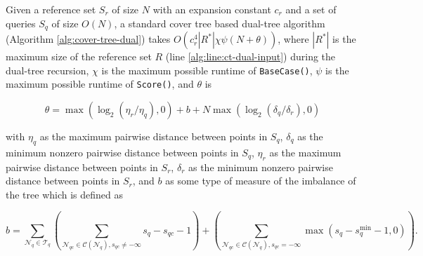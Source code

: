 \begin{thm}
\label{thm:ct-runtime}
Given a reference set $S_r$ of size $N$ with an expansion constant $c_r$ and a
set of queries $S_q$ of size $O(N)$, a standard cover tree based dual-tree
algorithm (Algorithm \ref{alg:cover-tree-dual}) takes $O(c_r^4 | R^* | \chi
\psi (N + \theta))$, where $ | R^* | $ is the maximum size of the reference set $R$ (line
\ref{alg:line:ct-dual-input}) during the dual-tree recursion, $\chi$ is
the maximum possible runtime of \texttt{BaseCase()}, $\psi$ is the maximum
possible runtime of \texttt{Score()}, and $\theta$ is

\begin{equation}
\theta = \max(\log_2(\eta_r / \eta_q), 0) + b + N \max(\log_2(\delta_q / \delta_r), 0)
\end{equation}

\noindent with $\eta_q$ as the maximum pairwise distance between points in
$S_q$, $\delta_q$ as the minimum nonzero pairwise distance between points in
$S_q$, $\eta_r$ as the maximum pairwise distance between points in $S_r$,
$\delta_r$ as the minimum nonzero pairwise distance between points in $S_r$, and
$b$ as some type of measure of the imbalance of the tree which is defined as

\begin{equation}
b = \sum_{\mathscr{N}_q \in \mathscr{T}_q} \left(\sum_{\mathscr{N}_{qc} \in
\mathscr{C}(\mathscr{N}_q), s_{qc} \ne -\infty} s_q - s_{qc} - 1 \right) +
\left(\sum_{\mathscr{N}_{qc} \in \mathscr{C}(\mathscr{N}_q), s_{qc} = -\infty}
\max(s_q - s_q^{\min} - 1, 0) \right).
\end{equation}
\end{thm}

